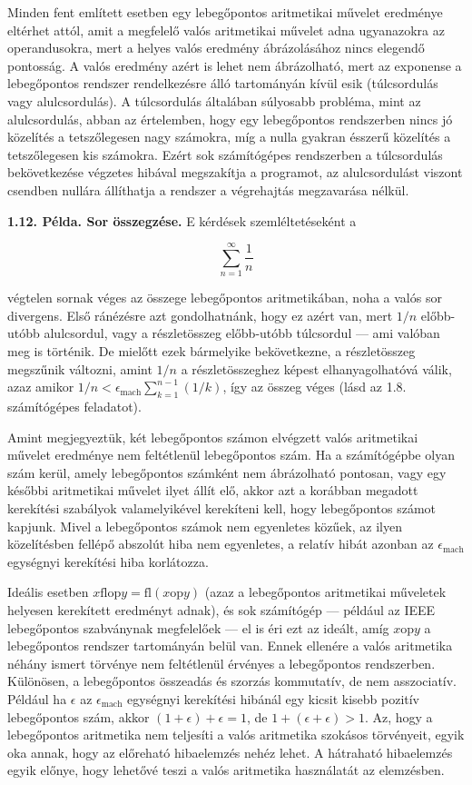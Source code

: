 \documentclass[
  magyar,
  11pt]{article}
\begin{document}
Minden fent említett esetben egy lebegőpontos aritmetikai művelet
eredménye eltérhet attól, amit a megfelelő valós aritmetikai művelet
adna ugyanazokra az operandusokra, mert a helyes valós eredmény
ábrázolásához nincs elegendő pontosság. A valós eredmény azért is lehet
nem ábrázolható, mert az exponense a lebegőpontos rendszer rendelkezésre
álló tartományán kívül esik (túlcsordulás vagy alulcsordulás). A
túlcsordulás általában súlyosabb probléma, mint az alulcsordulás, abban
az értelemben, hogy egy lebegőpontos rendszerben nincs jó közelítés a
tetszőlegesen nagy számokra, míg a nulla gyakran ésszerű közelítés a
tetszőlegesen kis számokra. Ezért sok számítógépes rendszerben a
túlcsordulás bekövetkezése végzetes hibával megszakítja a programot, az
alulcsordulást viszont csendben nullára állíthatja a rendszer a
végrehajtás megzavarása nélkül.

\textbf{1.12. Példa. Sor összegzése.} E kérdések szemléltetéseként a

\[\sum_{n=1}^{\infty} \frac{1}{n}\]

végtelen sornak véges az összege lebegőpontos aritmetikában, noha a
valós sor divergens. Első ránézésre azt gondolhatnánk, hogy ez azért
van, mert \(1/n\) előbb-utóbb alulcsordul, vagy a részletösszeg
előbb-utóbb túlcsordul --- ami valóban meg is történik. De mielőtt ezek
bármelyike bekövetkezne, a részletösszeg megszűnik változni, amint
\(1/n\) a részletösszeghez képest elhanyagolhatóvá válik, azaz amikor
\(1/n < \epsilon_{\text{mach}} \sum_{k=1}^{n-1} (1/k)\), így az összeg
véges (lásd az 1.8. számítógépes feladatot).

Amint megjegyeztük, két lebegőpontos számon elvégzett valós aritmetikai
művelet eredménye nem feltétlenül lebegőpontos szám. Ha a számítógépbe
olyan szám kerül, amely lebegőpontos számként nem ábrázolható pontosan,
vagy egy későbbi aritmetikai művelet ilyet állít elő, akkor azt a
korábban megadott kerekítési szabályok valamelyikével kerekíteni kell,
hogy lebegőpontos számot kapjunk. Mivel a lebegőpontos számok nem
egyenletes közűek, az ilyen közelítésben fellépő abszolút hiba nem
egyenletes, a relatív hibát azonban az \(\epsilon_{\text{mach}}\)
egységnyi kerekítési hiba korlátozza.

Ideális esetben
\(x \mathbin{\mathrm{flop}} y = \mathrm{fl}(x \mathbin{\mathrm{op}} y)\)
(azaz a lebegőpontos aritmetikai műveletek helyesen kerekített eredményt
adnak), és sok számítógép --- például az IEEE lebegőpontos szabványnak
megfelelőek --- el is éri ezt az ideált, amíg
\(x \mathbin{\mathrm{op}} y\) a lebegőpontos rendszer tartományán belül
van. Ennek ellenére a valós aritmetika néhány ismert törvénye nem
feltétlenül érvényes a lebegőpontos rendszerben. Különösen, a
lebegőpontos összeadás és szorzás kommutatív, de nem asszociatív.
Például ha \(\epsilon\) az \(\epsilon_{\text{mach}}\) egységnyi
kerekítési hibánál egy kicsit kisebb pozitív lebegőpontos szám, akkor
\((1 + \epsilon) + \epsilon = 1\), de \(1 + (\epsilon + \epsilon) > 1\).
Az, hogy a lebegőpontos aritmetika nem teljesíti a valós aritmetika
szokásos törvényeit, egyik oka annak, hogy az előreható hibaelemzés
nehéz lehet. A hátraható hibaelemzés egyik előnye, hogy lehetővé teszi a
valós aritmetika használatát az elemzésben.
\end{document}
